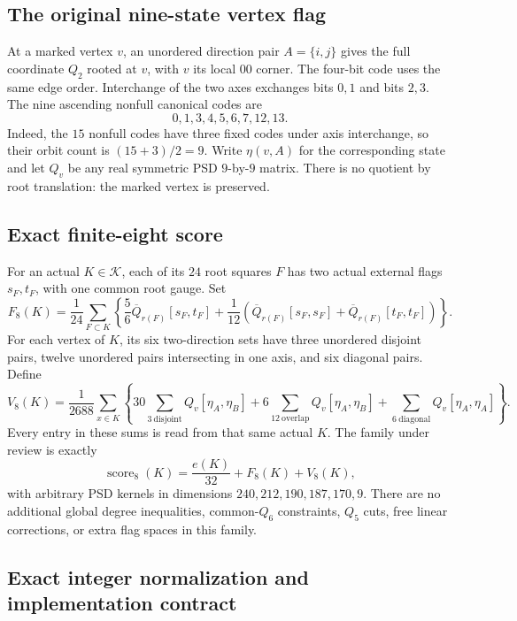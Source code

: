 \documentclass[11pt]{article}
\newcommand{\scor}{\operatorname{score}_8}
\begin{document}
\subsection{The original nine-state vertex flag}

At a marked vertex \(v\), an unordered direction pair \(A=\{i,j\}\)
gives the full coordinate \(Q_2\) rooted at \(v\), with \(v\) its local
\(00\) corner.  The four-bit code uses the same edge order.
Interchange of the two axes exchanges bits \(0,1\) and bits \(2,3\).
The nine ascending nonfull canonical codes are
\[
 0,1,3,4,5,6,7,12,13.
 \tag{G01.2}
\]
Indeed, the \(15\) nonfull codes have three fixed codes under axis
interchange, so their orbit count is \((15+3)/2=9\).
Write \(\eta(v,A)\) for the corresponding state and let \(Q_v\) be
any real symmetric PSD \(9\)-by-\(9\) matrix.
There is no quotient by root translation: the marked vertex is preserved.

\subsection{Exact finite-eight score}

For an actual \(K\in\mathcal K\), each of its \(24\) root squares \(F\)
has two actual external flags \(s_F,t_F\), with one common root gauge.
Set
\[
 F_8(K)=\frac1{24}\sum_{F\subset K}
 \left\{\frac56\overline Q_{r(F)}[s_F,t_F]
 +\frac1{12}\left(
   \overline Q_{r(F)}[s_F,s_F]
  +\overline Q_{r(F)}[t_F,t_F]\right)\right\}.
 \tag{G01.3}
\]
For each vertex of \(K\), its six two-direction sets have three unordered
disjoint pairs, twelve unordered pairs intersecting in one axis, and six
diagonal pairs.  Define
\[
 V_8(K)=\frac1{2688}\sum_{x\in K}
 \left\{
 30\sum_{\mathrm{3\ disjoint}}Q_v[\eta_A,\eta_B]
 +6\sum_{\mathrm{12\ overlap}}Q_v[\eta_A,\eta_B]
 +\sum_{\mathrm{6\ diagonal}}Q_v[\eta_A,\eta_A]\right\}.
 \tag{G01.4}
\]
Every entry in these sums is read from that same actual \(K\).
The family under review is exactly
\[
 \scor(K)=\frac{e(K)}{32}+F_8(K)+V_8(K),
 \tag{G01.5}
\]
with arbitrary PSD kernels in dimensions \(240,212,190,187,170,9\).
There are no additional global degree inequalities, common-\(Q_6\)
constraints, \(Q_5\) cuts, free linear corrections, or extra flag spaces
in this family.

\subsection{Exact integer normalization and implementation contract}
\end{document}
